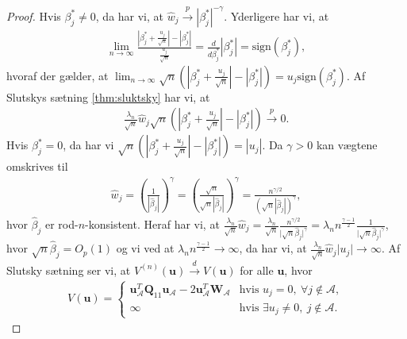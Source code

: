 \begin{proof}
Hvis $\beta_j^{*} \neq 0$, da har vi, at $\hat{w}_j \overset{p}{\rightarrow} \left\vert \beta_j^{*} \right\vert^{-\gamma}$. Yderligere har vi, at 
\begin{align*}
\lim_{n\rightarrow \infty}
\frac{\left\vert \beta_j^{*} +\frac{u_j}{\sqrt{n}} \right\vert - \left\vert \beta_j^{*} \right\vert}{\frac{u_j}{\sqrt{n}}} =\frac{d}{d \beta_j^{*}} \left\vert \beta_j^{*} \right\vert =\text{sign}\left(\beta_j^{*} \right),
\end{align*} 
hvoraf der gælder, at $\lim_{n\rightarrow \infty} \sqrt{n} \left( \left\vert \beta_j^{*} +\frac{u_j}{\sqrt{n}} \right\vert - \left\vert \beta_j^{*} \right\vert \right) = u_j \text{sign}\left(\beta_j^{*} \right)$.
Af Slutskys sætning \ref{thm:sluktsky} har vi, at 
\begin{align*}
\frac{ \lambda_n}{\sqrt{n}} \hat{w}_j \sqrt{n} \left(\left\vert \beta_j^{*} +\frac{u_j}{\sqrt{n}} \right\vert - \left\vert \beta_j^{*} \right\vert \right) \overset{p}{\rightarrow} 0.
\end{align*}
Hvis $\beta_j^{*} = 0$, da har vi $\sqrt{n} \left( \left\vert \beta_j^{*} +\frac{u_j}{\sqrt{n}} \right\vert - \left\vert \beta_j^{*} \right\vert \right) = \left\vert u_j \right\vert$.
Da $\gamma >0$ kan vægtene omskrives til 
\begin{align*}
\hat{w}_j= \left( \frac{1}{\left\vert \hat{\beta}_j \right\vert} \right)^\gamma=\left( \frac{\sqrt{n}}{\sqrt{n} \left\vert \hat{\beta}_j \right\vert} \right)^\gamma = \frac{n^{\gamma/2}}{ \left( \sqrt{n} \left\vert \hat{\beta}_j \right\vert \right)^\gamma},
\end{align*} 
hvor $\hat{\beta}_j$ er rod-$n$-konsistent. Heraf har vi, at $\frac{\lambda_n}{\sqrt{n}} \hat{w}_j = \frac{\lambda_n}{\sqrt{n}} \frac{n^{\gamma/2}}{\vert \sqrt{n} \hat{\beta}_j \vert^\gamma} = \lambda_n n^{\frac{\gamma -1}{2}} \frac{1}{\vert \sqrt{n} \hat{\beta}_j \vert^\gamma} $, hvor $\sqrt{n} \hat{\beta}_j = O_p(1)$ og vi ved at  $\lambda_n n^\frac{\gamma-1}{2} \rightarrow \infty$, da har vi, at $\frac{\lambda_n}{\sqrt{n}} \hat{w}_j  \vert u_j \vert \rightarrow \infty$.
Af Slutsky sætning ser vi, at $V^{(n)} (\mathbf{u}) \overset{d}{\rightarrow} V(\textbf{u})$ for alle $\mathbf{u}$, hvor
\begin{align*}
V(\textbf{u}) = \begin{cases}
    \mathbf{u}_\mathcal{A}^T \mathbf{Q}_{11} \mathbf{u}_\mathcal{A}-2\mathbf{u}^T_\mathcal{A} \mathbf{W}_\mathcal{A} & \text{hvis  $u_j=0, \ \forall j \notin \mathcal{A} $},\\
    \infty & \text{hvis } \exists u_j \neq 0, \ j \notin \mathcal{A} .

\end{cases}
\end{align*}
\end{proof}

